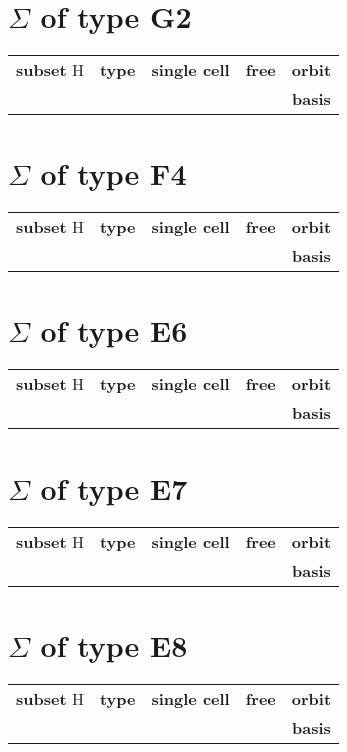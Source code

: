 \documentclass{article}
\newcommand{\resulttable}[1]{
  \section*{\(\Sigma\) of type #1}
\begin{longtable}{llccc}
  \toprule
  \textbf{subset} H & \textbf{type} & \textbf{single cell} & \textbf{free} & \textbf{orbit} \\
                    &               &                   &                & \textbf{basis} \\
  \midrule
  
  \bottomrule
\end{longtable}
}
\begin{document}
\resulttable{G2}
\resulttable{F4}\newpage
\resulttable{E6}\newpage
\resulttable{E7}\newpage
\resulttable{E8}
\end{document}
